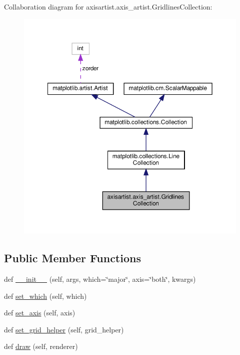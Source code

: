 Collaboration diagram for axisartist.\+axis\+\_\+artist.\+Gridlines\+Collection\+:
\nopagebreak
\begin{figure}[H]
\begin{center}
\leavevmode
\includegraphics[width=350pt]{classaxisartist_1_1axis__artist_1_1GridlinesCollection__coll__graph}
\end{center}
\end{figure}
\subsection*{Public Member Functions}
\begin{DoxyCompactItemize}
\item 
def \hyperlink{classaxisartist_1_1axis__artist_1_1GridlinesCollection_aa0f817815b40f60dbf772bf371c5eec6}{\+\_\+\+\_\+init\+\_\+\+\_\+} (self, args, which=\char`\"{}major\char`\"{}, axis=\char`\"{}both\char`\"{}, kwargs)
\item 
def \hyperlink{classaxisartist_1_1axis__artist_1_1GridlinesCollection_a6b4285049d60e97073b6723f86a65060}{set\+\_\+which} (self, which)
\item 
def \hyperlink{classaxisartist_1_1axis__artist_1_1GridlinesCollection_a9576b68da0d3c39336c020ec045ef179}{set\+\_\+axis} (self, axis)
\item 
def \hyperlink{classaxisartist_1_1axis__artist_1_1GridlinesCollection_aabe6d8c6e934c76ecfff464c08e95e03}{set\+\_\+grid\+\_\+helper} (self, grid\+\_\+helper)
\item 
def \hyperlink{classaxisartist_1_1axis__artist_1_1GridlinesCollection_a063e517786eaad55385e2510bd74e370}{draw} (self, renderer)
\end{DoxyCompactItemize}
